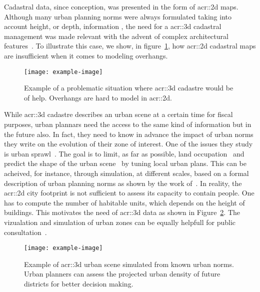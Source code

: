         Cadastral data, since conception, was presented in the form of \gls{acr::2d} maps\addref.
        Although many urban planning norms were always formulated taking into account height, or depth, information \addref, the need for a \gls{acr::3d} cadastral management was made relevant with the advent of complex architectural features~\textcite{ijgi4042842}.
        To illustrate this case, we show, in figure~\ref{fig::3d_cadastre_need_example}, how \gls{acr::2d} cadastral maps are insufficient when it comes to modeling overhangs.
        \\
        \begin{figure}[h]
            \centering
            \texttt{[image: example-image]}             
            \caption{\label{fig::3d_cadastre_need_example} Example of a problematic situation where \gls{acr::3d} cadastre would be of help. Overhangs are hard to model in \gls{acr::2d}.}
        \end{figure}
        While \gls{acr::3d} cadastre describes an urban scene at a certain time for fiscal purposes, urban plannars need the access to the same kind of information but in the future also.
        In fact, they need to know in advance the impact of urban norms they write on the evolution of their zone of interest.  
        One of the issues they study is urban sprawl~\parencite{ludlow2006urban}.
        The goal is to limit, as far as possible, land occupation~\parencite{TANNIER2012128} and predict the shape of the urban scene~\parencite{brasebin20183d} by tuning local urban plans.
        This can be acheived, for instance, through simulation, at different scales, based on a formal description of urban planning norms as shown by the work of~\textcite{Colomb17a}.
        In reality, the \gls{acr::2d} city footprint is not sufficient to assess its capacity to contain people.
        One has to compute the number of habitable units, which depends on the height of buildings.
        This motivates the need of \gls{acr::3d} data as shown in Figure~\ref{fig::3d_simulation}.
        The  vizualation and simulation of urban zones can be equally helpfull for public consultation~\parencite{WU2010291}.\\
        \begin{figure}[h]
            \centering
            \texttt{[image: example-image]}             
            \caption{
                \label{fig::3d_simulation} Example of \gls{acr::3d} urban scene simulated from known urban norms.
                Urban planners can assess the projected urban density of future districts for better decision making.
            }
        \end{figure}

